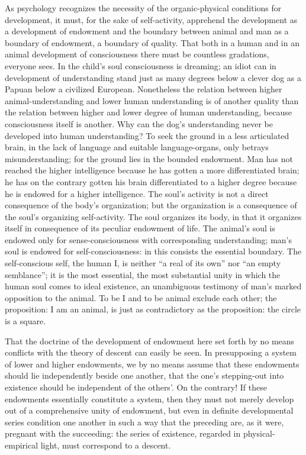 \documentclass[12pt]{book}
\begin{document}
As psychology recognizes the necessity of the organic-physical conditions for development, it
must, for the sake of self-activity, apprehend the development as a development of endowment
and the boundary between animal and man as a boundary of endowment, a boundary of quality.
That both in a human and in an animal development of consciousness there must be countless
gradations, everyone sees. In the child's soul consciousness is dreaming; an idiot can in
development of understanding stand just as many degrees below a clever dog as a Papuan below
a civilized European. Nonetheless the relation between higher animal-understanding and lower
human understanding is of another quality than the relation between higher and lower degree
of human understanding, because consciousness itself is another. Why can the dog's
understanding never be developed into human understanding? To seek the ground in a less
articulated brain, in the lack of language and suitable language-organs, only betrays
misunderstanding; for the ground lies in the bounded endowment. Man has not reached the
higher intelligence because he has gotten a more differentiated brain; he has on the contrary
gotten his brain differentiated to a higher degree because he is endowed for a higher
intelligence. The soul's activity is not a direct consequence of the body's organization;
but the organization is a consequence of the soul's organizing self-activity. The soul
organizes its body, in that it organizes itself in consequence of its peculiar endowment of
life. The animal's soul is endowed only for sense-consciousness with corresponding
understanding; man's soul is endowed for self-consciousness: in this consists the essential
boundary. The self-conscious self, the human I, is neither ``a real of its own'' nor ``an
empty semblance''; it is the most essential, the most substantial unity in which the human
soul comes to ideal existence, an unambiguous testimony of man's marked opposition to the
animal. To be I and to be animal exclude each other; the proposition: I am an animal, is just
as contradictory as the proposition: the circle is a square.

That the doctrine of the development of endowment here set forth by no means conflicts with
the theory of descent can easily be seen. In presupposing a system of lower and higher
endowments, we by no means assume that these endowments should lie independently beside one
another, that the one's stepping-out into existence should be independent of the others'. On
the contrary! If these endowments essentially constitute a system, then they must not merely
develop out of a comprehensive unity of endowment, but even in definite developmental series
condition one another in such a way that the preceding are, as it were, pregnant with the
succeeding: the series of existence, regarded in physical-empirical light, must correspond to
a descent.
\end{document}
